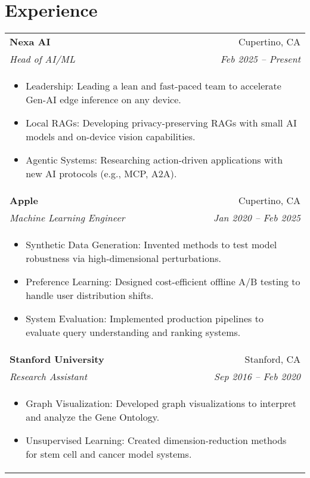 \documentclass[letterpaper,11pt]{article}
\begin{document}
\section{Experience}
\begin{tabular*}{0.97\textwidth}[t]{l@{\extracolsep{\fill}}r}
  \textbf{Nexa AI} & Cupertino, CA \\
  \textit{\small Head of AI/ML} & \textit{\small Feb 2025 -- Present} \\
  \multicolumn{2}{l}{
    \begin{minipage}{\textwidth}
      \begin{itemize}[leftmargin=1.2em, itemsep=0.5pt, topsep=1pt]
        \item Leadership: Leading a lean and fast-paced team to accelerate Gen-AI edge inference on any device.
        \item Local RAGs: Developing privacy-preserving RAGs with small AI models and on-device vision capabilities.
        \item Agentic Systems: Researching action-driven applications with new AI protocols (e.g., MCP, A2A).
      \end{itemize}
    \end{minipage}
  } \\

  \textbf{Apple} & Cupertino, CA \\
  \textit{\small Machine Learning Engineer} & \textit{\small Jan 2020 -- Feb 2025} \\
  \multicolumn{2}{l}{
    \begin{minipage}{\textwidth}
      \begin{itemize}[leftmargin=1.2em, itemsep=2pt, topsep=0pt]
        \item Synthetic Data Generation: Invented methods to test model robustness via high-dimensional perturbations.
        \item Preference Learning: Designed cost-efficient offline A/B testing to handle user distribution shifts.
        \item System Evaluation: Implemented production pipelines to evaluate query understanding and ranking systems.
      \end{itemize}
    \end{minipage}
  } \\

  \textbf{Stanford University} & Stanford, CA \\
  \textit{\small Research Assistant} & \textit{\small Sep 2016 -- Feb 2020} \\
  \multicolumn{2}{l}{
    \begin{minipage}{\textwidth}
      \begin{itemize}[leftmargin=1.2em, itemsep=1pt, topsep=0pt]
        \item Graph Visualization: Developed graph visualizations to interpret and analyze the Gene Ontology.
        \item Unsupervised Learning: Created dimension-reduction methods for stem cell and cancer model systems.
      \end{itemize}
    \end{minipage}
  } \\


\end{tabular*}
\end{document}
